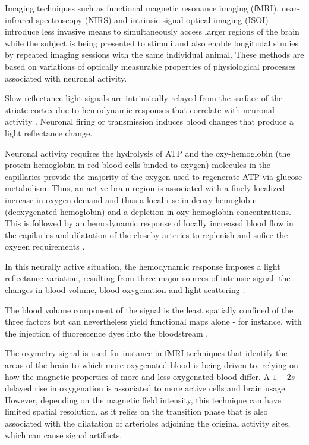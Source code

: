 Imaging techniques such as functional magnetic resonance imaging (fMRI), near-infrared spectroscopy (NIRS) and intrinsic signal optical imaging (ISOI) introduce less invasive means to simultaneously access larger regions of the brain while the subject is being presented to stimuli and also enable longitudal studies by repeated imaging sessions with the same individual animal. These methods are based on variations of optically measurable properties of physiological processes associated with neuronal activity.

Slow reflectance light signals are intrinsically relayed from the surface of the striate cortex due to hemodynamic responses that correlate with neuronal activity \cite{Cohen1973}. Neuronal firing or transmission induces blood changes that produce a light reflectance change.

Neuronal activity requires the hydrolysis of ATP and the oxy-hemoglobin (the protein hemoglobin in red blood cells binded to oxygen) molecules in the capillaries provide the majority of the oxygen used to regenerate ATP via glucose metabolism. Thus, an active brain region is associated with a finely localized increase in oxygen demand and thus a local rise in deoxy-hemoglobin (deoxygenated hemoglobin) and a depletion in oxy-hemoglobin concentrations. This is followed by an hemodynamic response of locally increased blood flow in the capilaries and dilatation of the closeby arteries to replenish and sufice the oxygen requirements  \cite{Frostig1990}.

In this neurally active situation, the hemodynamic response imposes a light reflectance variation, resulting from three major sources of intrinsic signal: the changes in blood volume\cite{Frostig1990}, blood oxygenation \cite{Vanzetta1999} and light scattering \cite{HillKeynes1949}.

The blood volume component of the signal is the least spatially confined of the three factors but can nevertheless yield functional maps alone - for instance, with the injection of fluorescence dyes into the bloodstream \cite{Frostig1990}.

The oxymetry signal is used for instance in fMRI techniques that identify the areas of the brain to which more oxygenated blood is being driven to, relying on how the magnetic properties of more and less oxygenated blood differ. A $1-2s$ delayed rise in oxygenation is associated to more active cells and brain usage. However, depending on the magnetic field intensity, this technique can have limited spatial resolution, as it relies on the transition phase that is also associated with the dilatation of arterioles adjoining the original activity sites, which can cause signal artifacts.

